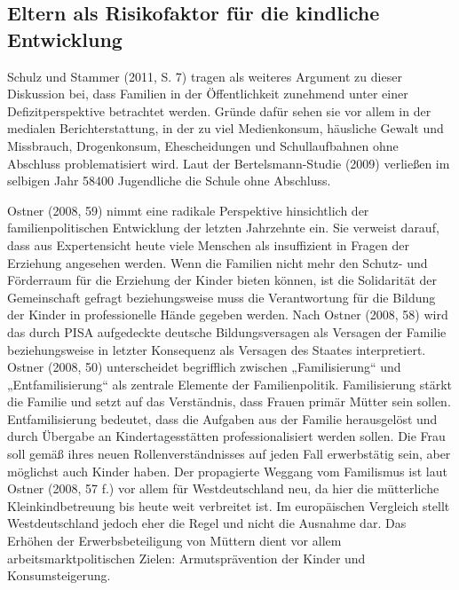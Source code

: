 \subsection{Eltern als Risikofaktor für die kindliche Entwicklung}\label{sec:Risikofaktoren}
Schulz und Stammer (2011, S. 7) tragen als weiteres Argument zu dieser Diskussion bei, dass Familien in der Öffentlichkeit zunehmend unter einer Defizitperspektive betrachtet werden. Gründe dafür sehen sie vor allem in der medialen Berichterstattung, in der zu viel Medienkonsum, häusliche Gewalt und Missbrauch, Drogenkonsum, Ehescheidungen und  Schullaufbahnen ohne Abschluss problematisiert wird. Laut der Bertelsmann-Studie (2009) verließen im selbigen Jahr 58400 Jugendliche die Schule ohne Abschluss. 

Ostner (2008, 59) nimmt eine radikale Perspektive hinsichtlich der familienpolitischen Entwicklung der letzten Jahrzehnte ein. Sie verweist darauf, dass aus Expertensicht heute viele Menschen als insuffizient in Fragen der Erziehung angesehen werden. Wenn die Familien nicht mehr den Schutz- und Förderraum für die Erziehung der Kinder bieten können, ist die Solidarität der Gemeinschaft gefragt beziehungsweise muss die Verantwortung für die Bildung der Kinder in professionelle Hände gegeben werden. Nach Ostner (2008, 58) wird das durch PISA aufgedeckte deutsche Bildungsversagen als Versagen der Familie beziehungsweise in letzter Konsequenz als Versagen des Staates interpretiert. Ostner (2008, 50) unterscheidet begrifflich zwischen „Familisierung“ und „Entfamilisierung“ als zentrale Elemente der Familienpolitik. Familisierung stärkt die Familie und setzt auf das Verständnis, dass Frauen primär Mütter sein sollen. Entfamilisierung bedeutet, dass die Aufgaben aus der Familie herausgelöst und durch Übergabe an Kindertagesstätten professionalisiert werden sollen. Die Frau soll gemäß ihres neuen Rollenverständnisses auf jeden Fall erwerbstätig sein, aber möglichst auch Kinder haben. Der propagierte Weggang vom Familismus ist laut Ostner (2008, 57 f.) vor allem für Westdeutschland neu, da hier die mütterliche Kleinkindbetreuung bis heute weit verbreitet ist. Im europäischen Vergleich stellt Westdeutschland jedoch eher die Regel und nicht die Ausnahme dar. Das Erhöhen der Erwerbsbeteiligung von Müttern dient vor allem arbeitsmarktpolitischen Zielen: Armutsprävention der Kinder und  Konsumsteigerung. 
